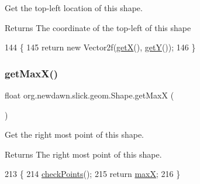 Get the top-\/left location of this shape.

\begin{DoxyReturn}{Returns}
The coordinate of the top-\/left of this shape 
\end{DoxyReturn}

\begin{DoxyCode}
144                                   \{
145         \textcolor{keywordflow}{return} \textcolor{keyword}{new} Vector2f(\mbox{\hyperlink{classorg_1_1newdawn_1_1slick_1_1geom_1_1_shape_a736a47bfdd6f164558b43fd497a3a3f3}{getX}}(), \mbox{\hyperlink{classorg_1_1newdawn_1_1slick_1_1geom_1_1_shape_a5f334f962d8fc525d522fe0f8ac20b35}{getY}}());
146     \}
\end{DoxyCode}
\mbox{\label{classorg_1_1newdawn_1_1slick_1_1geom_1_1_shape_ac3770421955c18dbf97dbaac012e0727}} 
\subsubsection{\texorpdfstring{get\+Max\+X()}{getMaxX()}}
{\footnotesize\ttfamily float org.\+newdawn.\+slick.\+geom.\+Shape.\+get\+MaxX (\begin{DoxyParamCaption}{ }\end{DoxyParamCaption})\hspace{0.3cm}{\ttfamily [inline]}}

Get the right most point of this shape.

\begin{DoxyReturn}{Returns}
The right most point of this shape. 
\end{DoxyReturn}

\begin{DoxyCode}
213                            \{
214         \mbox{\hyperlink{classorg_1_1newdawn_1_1slick_1_1geom_1_1_shape_a84293802d05e8666a441720bfc12745d}{checkPoints}}();
215         \textcolor{keywordflow}{return} \mbox{\hyperlink{classorg_1_1newdawn_1_1slick_1_1geom_1_1_shape_a8c820b5a7df465beab7f021cdd09b826}{maxX}};
216     \}
\end{DoxyCode}
\mbox{\label{classorg_1_1newdawn_1_1slick_1_1geom_1_1_shape_a860925719455f1c95a99983d268230b7}} 
